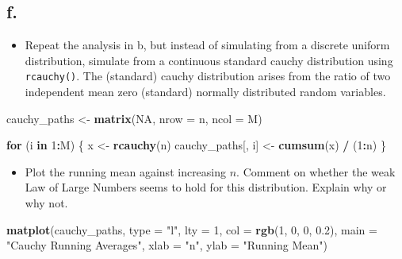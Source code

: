 \documentclass[
]{article}
\newenvironment{Shaded}{\begin{snugshade}}{\end{snugshade}}
\newcommand{\AttributeTok}[1]{\textcolor[rgb]{0.13,0.29,0.53}{#1}}
\newcommand{\ConstantTok}[1]{\textcolor[rgb]{0.56,0.35,0.01}{#1}}
\newcommand{\ControlFlowTok}[1]{\textcolor[rgb]{0.13,0.29,0.53}{\textbf{#1}}}
\newcommand{\DecValTok}[1]{\textcolor[rgb]{0.00,0.00,0.81}{#1}}
\newcommand{\FloatTok}[1]{\textcolor[rgb]{0.00,0.00,0.81}{#1}}
\newcommand{\FunctionTok}[1]{\textcolor[rgb]{0.13,0.29,0.53}{\textbf{#1}}}
\newcommand{\NormalTok}[1]{#1}
\newcommand{\OtherTok}[1]{\textcolor[rgb]{0.56,0.35,0.01}{#1}}
\newcommand{\SpecialCharTok}[1]{\textcolor[rgb]{0.81,0.36,0.00}{\textbf{#1}}}
\newcommand{\StringTok}[1]{\textcolor[rgb]{0.31,0.60,0.02}{#1}}
\providecommand{\tightlist}{%
  \setlength{\itemsep}{0pt}\setlength{\parskip}{0pt}}
\begin{document}
\subsection{f.~}\label{f.}

\begin{itemize}
\tightlist
\item
  Repeat the analysis in b, but instead of simulating from a discrete
  uniform distribution, simulate from a continuous standard cauchy
  distribution using \texttt{rcauchy()}. The (standard) cauchy
  distribution arises from the ratio of two independent mean zero
  (standard) normally distributed random variables.
\end{itemize}

\begin{Shaded}
\begin{Highlighting}[]
\NormalTok{cauchy\_paths }\OtherTok{\textless{}{-}} \FunctionTok{matrix}\NormalTok{(}\ConstantTok{NA}\NormalTok{, }\AttributeTok{nrow =}\NormalTok{ n, }\AttributeTok{ncol =}\NormalTok{ M)}

\ControlFlowTok{for}\NormalTok{ (i }\ControlFlowTok{in} \DecValTok{1}\SpecialCharTok{:}\NormalTok{M) \{}
\NormalTok{  x }\OtherTok{\textless{}{-}} \FunctionTok{rcauchy}\NormalTok{(n)}
\NormalTok{  cauchy\_paths[, i] }\OtherTok{\textless{}{-}} \FunctionTok{cumsum}\NormalTok{(x) }\SpecialCharTok{/}\NormalTok{ (}\DecValTok{1}\SpecialCharTok{:}\NormalTok{n)}
\NormalTok{\}}
\end{Highlighting}
\end{Shaded}

\begin{itemize}
\tightlist
\item
  Plot the running mean against increasing \(n\). Comment on whether the
  weak Law of Large Numbers seems to hold for this distribution. Explain
  why or why not.
\end{itemize}

\begin{Shaded}
\begin{Highlighting}[]
\FunctionTok{matplot}\NormalTok{(cauchy\_paths, }\AttributeTok{type =} \StringTok{"l"}\NormalTok{, }\AttributeTok{lty =} \DecValTok{1}\NormalTok{, }\AttributeTok{col =} \FunctionTok{rgb}\NormalTok{(}\DecValTok{1}\NormalTok{, }\DecValTok{0}\NormalTok{, }\DecValTok{0}\NormalTok{, }\FloatTok{0.2}\NormalTok{),}
        \AttributeTok{main =} \StringTok{"Cauchy Running Averages"}\NormalTok{,}
        \AttributeTok{xlab =} \StringTok{"n"}\NormalTok{, }\AttributeTok{ylab =} \StringTok{"Running Mean"}\NormalTok{)}
\end{Highlighting}
\end{Shaded}
\end{document}
